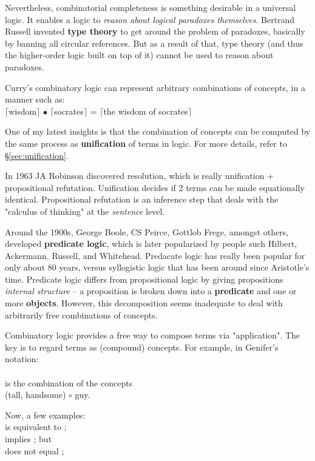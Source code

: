 Nevertheless, combinatorial completeness is something desirable in a universal logic.  It enables a logic to \textit{reason about logical paradoxes themselves}.  Bertrand Russell invented \textbf{type theory} to get around the problem of paradoxes, basically by banning all circular references.  But as a result of that, type theory (and thus the higher-order logic built on top of it) cannot be used to reason about paradoxes.

Curry's combinatory logic can represent arbitrary combinations of concepts, in a manner such as:\\
\tab $\lceil$wisdom$\rceil$ $\bullet$ $\lceil$socrates$\rceil$ = $\lceil$the wisdom of socrates$\rceil$

One of my latest insights is that the combination of concepts can be computed by the same process as \textbf{unification} of terms in logic.  For more details, refer to \S\ref{sec:unification}.

In 1963 JA Robinson discovered resolution, which is really unification + propositional refutation.  Unification decides if 2 terms can be made equationally identical.  Propositional refutation is an inference step that deals with the "calculus of thinking" at the \textit{sentence} level.

Around the 1900s, George Boole, CS Peirce, Gottlob Frege, amongst others, developed \textbf{predicate logic}, which is later popularized by people such Hilbert, Ackermann, Russell, and Whitehead.  Predacate logic has really been popular for only about 80 years, versus syllogistic logic that has been around since Aristotle's time.  Predicate logic differs from propositional logic by giving propositions \textit{internal structure} -- a proposition is broken down into a \textbf{predicate} and one or more \textbf{objects}.  However, this decomposition seems inadequate to deal with arbitrarily free combinations of concepts.

Combinatory logic provides a free way to compose terms via "application".  The key is to regard terms as (compound) concepts.  For example, in Genifer's notation:\\
\tab {}\\
is the combination of the concepts\\
\tab (tall, handsome) $\circ$ guy.

Now, a few examples:\\
 is equivalent to ;\\
 implies ;  but\\
 does not equal ;

